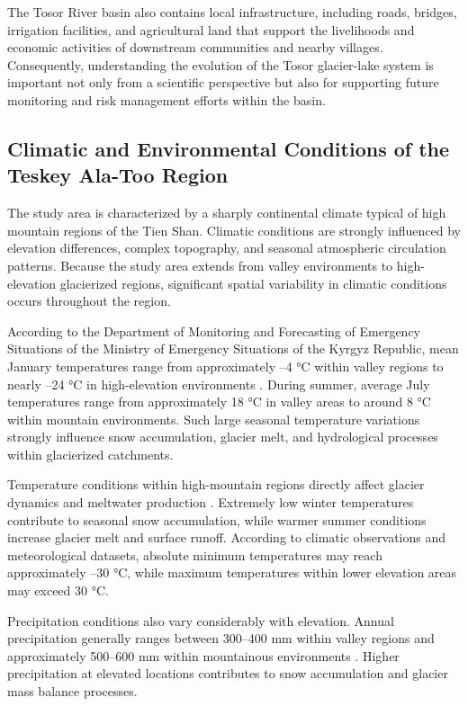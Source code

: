 \documentclass[12pt,a4paper]{report}
\begin{document}
The Tosor River basin also contains local infrastructure, including roads, bridges, irrigation facilities, and agricultural land that support the livelihoods and economic activities of downstream communities and nearby villages. Consequently, understanding the evolution of the Tosor glacier-lake system is important not only from a scientific perspective but also for supporting future monitoring and risk management efforts within the basin.

\subsection{Climatic and Environmental Conditions of the Teskey Ala-Too Region}

The study area is characterized by a sharply continental climate \cite{MESKR2024} typical of high mountain regions of the Tien Shan. Climatic conditions are strongly influenced by elevation differences, complex topography, and seasonal atmospheric circulation patterns. Because the study area extends from valley environments to high-elevation glacierized regions, significant spatial variability in climatic conditions occurs throughout the region. 

According to the Department of Monitoring and Forecasting of Emergency Situations of the Ministry of Emergency Situations of the Kyrgyz Republic, mean January temperatures range from approximately –4 °C within valley regions to nearly –24 °C in high-elevation environments \cite{MESKR2024}. During summer, average July temperatures range from approximately 18 °C in valley areas to around 8 °C within mountain environments. Such large seasonal temperature variations strongly influence snow accumulation, glacier melt, and hydrological processes within glacierized catchments. 

Temperature conditions within high-mountain regions directly affect glacier dynamics and meltwater production \cite{Sorg2012}. Extremely low winter temperatures contribute to seasonal snow accumulation, while warmer summer conditions increase glacier melt and surface runoff. According to climatic observations and meteorological datasets, absolute minimum temperatures may reach approximately –30 °C, while maximum temperatures within lower elevation areas may exceed 30 °C. 

Precipitation conditions also vary considerably with elevation. Annual precipitation generally ranges between 300–400 mm within valley regions and approximately 500–600 mm within mountainous environments \cite{MESKR2024}. Higher precipitation at elevated locations contributes to snow accumulation and glacier mass balance processes. 
\end{document}
